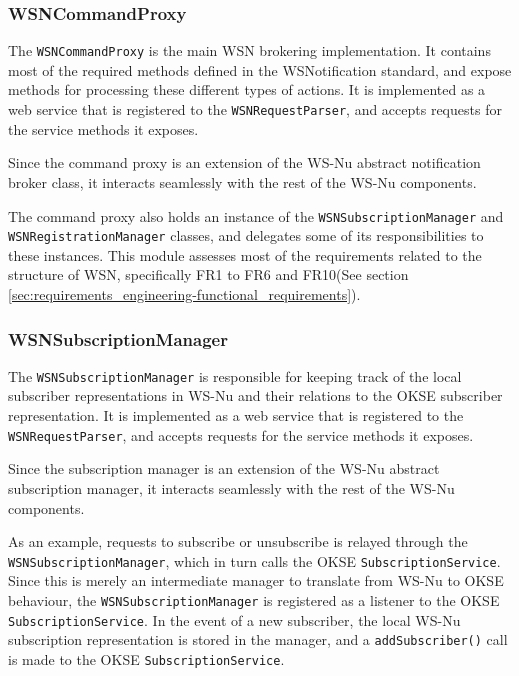 \subsubsection{WSNCommandProxy}

The \verb!WSNCommandProxy! is the main WSN brokering implementation. It contains most of the required methods defined in the WSNotification standard, and expose methods for processing these different types of actions. It is implemented as a web service that is registered to the \verb!WSNRequestParser!, and accepts requests for the service methods it exposes.

Since the command proxy is an extension of the WS-Nu abstract notification broker class, it interacts seamlessly with the rest of the WS-Nu components.

The command proxy also holds an instance of the \verb!WSNSubscriptionManager! and \verb!WSNRegistrationManager! classes, and delegates some of its responsibilities to these instances. This module assesses most of the requirements related to the structure of WSN, specifically FR1 to FR6 and FR10(See section \ref{sec:requirements_engineering-functional_requirements}).

\subsubsection{WSNSubscriptionManager}

The \verb!WSNSubscriptionManager! is responsible for keeping track of the local subscriber representations in WS-Nu and their relations to the OKSE subscriber representation. It is implemented as a web service that is registered to the \verb!WSNRequestParser!, and accepts requests for the service methods it exposes.

Since the subscription manager is an extension of the WS-Nu abstract subscription manager, it interacts seamlessly with the rest of the WS-Nu components.

As an example, requests to subscribe or unsubscribe is relayed through the \\\verb!WSNSubscriptionManager!, which in turn calls the OKSE \verb!SubscriptionService!. Since this is merely an intermediate manager to translate from WS-Nu to OKSE behaviour, the \verb!WSNSubscriptionManager! is registered as a listener to the OKSE \\ \verb!SubscriptionService!. In the event of a new subscriber, the local WS-Nu subscription representation is stored in the manager, and a \verb!addSubscriber()! call is made to the OKSE \verb!SubscriptionService!.


